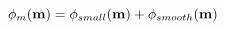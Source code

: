 \vspace{-0.1cm}
\begin{equation}
    \phi_m(\mathbf{m}) = \phi_{small}(\mathbf{m}) + \phi_{smooth}(\mathbf{m})
    \label{eq:forward-pass}
    \vspace{-0.05cm}
\end{equation}